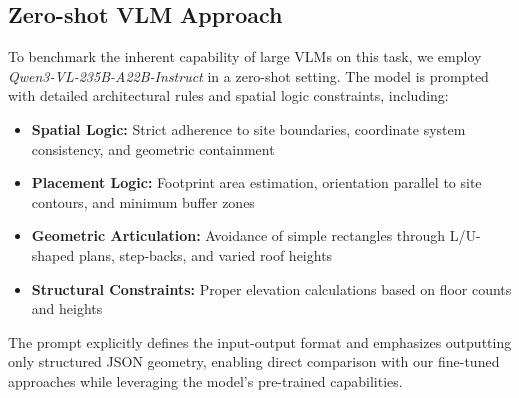 \subsection{Zero-shot VLM Approach}
To benchmark the inherent capability of large VLMs on this task, we employ \textit{Qwen3-VL-235B-A22B-Instruct} \cite{huggingface} in a zero-shot setting. The model is prompted with detailed architectural rules and spatial logic constraints, including:

\begin{itemize}
    \item \textbf{Spatial Logic:} Strict adherence to site boundaries, coordinate system consistency, and geometric containment
    \item \textbf{Placement Logic:} Footprint area estimation, orientation parallel to site contours, and minimum buffer zones
    \item \textbf{Geometric Articulation:} Avoidance of simple rectangles through L/U-shaped plans, step-backs, and varied roof heights
    \item \textbf{Structural Constraints:} Proper elevation calculations based on floor counts and heights
\end{itemize}

The prompt explicitly defines the input-output format and emphasizes outputting only structured JSON geometry, enabling direct comparison with our fine-tuned approaches while leveraging the model's pre-trained capabilities.

